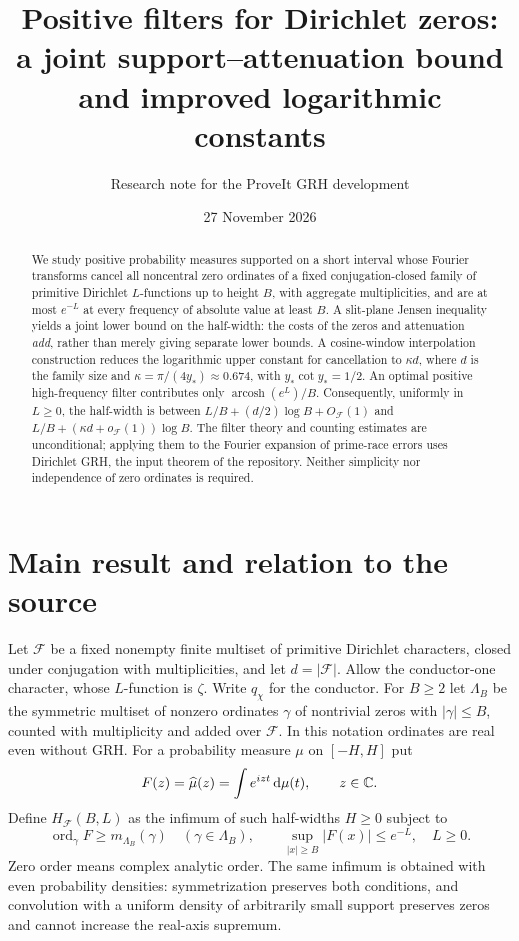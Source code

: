 \documentclass[11pt]{article}
\title{Positive filters for Dirichlet zeros:\\ a joint support--attenuation bound\\ and improved logarithmic constants}
\author{Research note for the ProveIt GRH development}
\date{27 November 2026}
\theoremstyle{remark}\newtheorem{remark}[theorem]{Remark}
\newcommand{\arcosh}{\operatorname{arcosh}}\newcommand{\ord}{\operatorname{ord}}
\newcommand{\F}{\mathcal F}\newcommand{\dd}{\mathrm d}
\begin{document}
\maketitle
\begin{abstract}
We study positive probability measures supported on a short interval whose Fourier transforms cancel all noncentral zero ordinates of a fixed conjugation-closed family of primitive Dirichlet $L$-functions up to height $B$, with aggregate multiplicities, and are at most $e^{-L}$ at every frequency of absolute value at least $B$. A slit-plane Jensen inequality yields a joint lower bound on the half-width: the costs of the zeros and attenuation \emph{add}, rather than merely giving separate lower bounds. A cosine-window interpolation construction reduces the logarithmic upper constant for cancellation to $\kappa d$, where $d$ is the family size and $\kappa=\pi/(4y_*)\approx0.674$, with $y_*\cot y_*=1/2$. An optimal positive high-frequency filter contributes only $\arcosh(e^L)/B$. Consequently, uniformly in $L\ge0$, the half-width is between $L/B+(d/2)\log B+O_{\F}(1)$ and $L/B+(\kappa d+o_{\F}(1))\log B$. The filter theory and counting estimates are unconditional; applying them to the Fourier expansion of prime-race errors uses Dirichlet GRH, the input theorem of the repository. Neither simplicity nor independence of zero ordinates is required.
\end{abstract}

\section{Main result and relation to the source}
Let $\F$ be a fixed nonempty finite multiset of primitive Dirichlet characters, closed under conjugation with multiplicities, and let $d=|\F|$. Allow the conductor-one character, whose $L$-function is $\zeta$. Write $q_\chi$ for the conductor. For $B\ge2$ let $\Lambda_B$ be the symmetric multiset of nonzero ordinates $\gamma$ of nontrivial zeros with $|\gamma|\le B$, counted with multiplicity and added over $\F$. In this notation ordinates are real even without GRH. For a probability measure $\mu$ on $[-H,H]$ put
\[
 F(z)=\widehat\mu(z)=\int e^{izt}\,\dd\mu(t),\qquad z\in\C.
\]
Define $H_{\F}(B,L)$ as the infimum of such half-widths $H\ge0$ subject to
\begin{equation}\label{eq:conditions}
 \ord_\gamma F\ge m_{\Lambda_B}(\gamma)\quad(\gamma\in\Lambda_B),\qquad
 \sup_{|x|\ge B}|F(x)|\le e^{-L},\quad L\ge0.
\end{equation}
Zero order means complex analytic order. The same infimum is obtained with even probability densities: symmetrization preserves both conditions, and convolution with a uniform density of arbitrarily small support preserves zeros and cannot increase the real-axis supremum.
\end{document}
